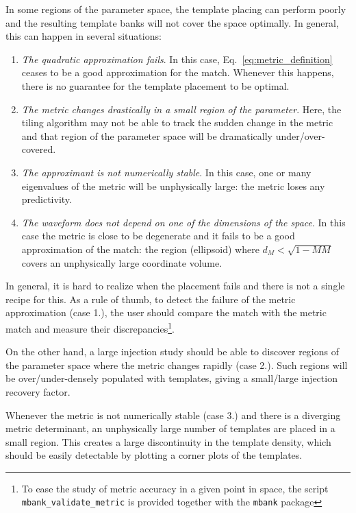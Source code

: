 \documentclass[twocolumn,showpacs,preprintnumbers,nofootinbib,prd,
superscriptaddress,10pt]{revtex4-2}
\begin{document}
In some regions of the parameter space, the template placing can perform poorly and the resulting template banks will not cover the space optimally.
In general, this can happen in several situations:

\begin{enumerate}
	\item {\it The quadratic approximation fails}. In this case, Eq.~\eqref{eq:metric_definition} ceases to be a good approximation for the match. Whenever this happens, there is no guarantee for the template placement to be optimal.
	\item {\it The metric changes drastically in a small region of the parameter}. Here, the tiling algorithm may not be able to track the sudden change in the metric and that region of the parameter space will be dramatically under/over-covered.
	\item {\it The approximant is not numerically stable}. In this case, one or many eigenvalues of the metric will be unphysically large: the metric loses any predictivity.
	\item {\it The waveform does not depend on one of the dimensions of the space}. In this case the metric is close to be degenerate and it fails to be a good approximation of the match: the region (ellipsoid) where $d_M<\sqrt{1-MM}$ covers an unphysically large coordinate volume.
\end{enumerate}

In general, it is hard to realize when the placement fails and there is not a single recipe for this.
%
As a rule of thumb, to detect the failure of the metric approximation (case 1.), the user should compare the match with the metric match and measure their discrepancies\footnote{To ease the study of metric accuracy in a given point in space, the script \texttt{mbank\_validate\_metric} is provided together with the \texttt{mbank} package}.

On the other hand, a large injection study should be able to discover regions of the parameter space where the metric changes rapidly (case 2.). Such regions will be over/under-densely populated with templates, giving a small/large injection recovery factor.

Whenever the metric is not numerically stable (case 3.) and there is a diverging metric determinant, an unphysically large number of templates are placed in a small region. This creates a large discontinuity in the template density, which should be easily detectable by plotting a corner plots of the templates.
\end{document}
